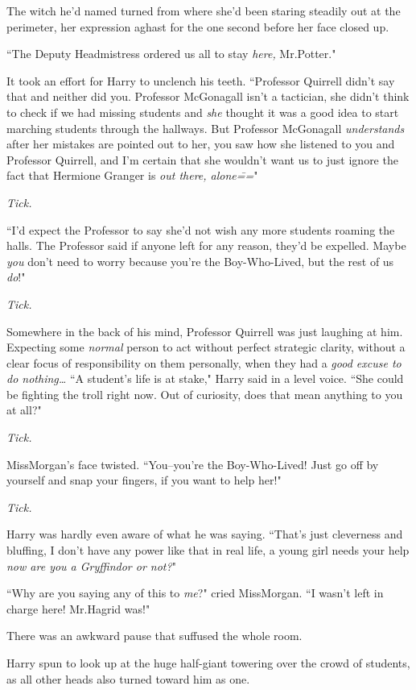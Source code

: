 The witch he'd named turned from where she'd been staring steadily out at the perimeter, her expression aghast for the one second before her face closed up.

``The Deputy Headmistress ordered us all to stay \emph{here,} Mr.\?Potter."

It took an effort for Harry to unclench his teeth. ``Professor Quirrell didn't say that and neither did you. Professor McGonagall isn't a tactician, she didn't think to check if we had missing students and \emph{she} thought it was a good idea to start marching students through the hallways. But Professor McGonagall \emph{understands} after her mistakes are pointed out to her, you saw how she listened to you and Professor Quirrell, and I'm certain that she wouldn't want us to just ignore the fact that Hermione Granger is \emph{out there, alone\===}"

\emph{Tick.}

``I'd expect the Professor to say she'd not wish any more students roaming the halls. The Professor said if anyone left for any reason, they'd be expelled. Maybe \emph{you} don't need to worry because you're the Boy-Who-Lived, but the rest of us \emph{do}!"

\emph{Tick.}

Somewhere in the back of his mind, Professor Quirrell was just laughing at him. Expecting some \emph{normal} person to act without perfect strategic clarity, without a clear focus of responsibility on them personally, when they had a \emph{good excuse to do nothing{\ldots}} ``A student's life is at stake," Harry said in a level voice. ``She could be fighting the troll right now. Out of curiosity, does that mean anything to you at all?"

\emph{Tick.}

Miss\?Morgan's face twisted. ``You\---you're the Boy-Who-Lived! Just go off by yourself and snap your fingers, if you want to help her!"

\emph{Tick.}

Harry was hardly even aware of what he was saying. ``That's just cleverness and bluffing, I don't have any power like that in real life, a young girl needs your help \emph{now are you a Gryffindor or not?}"

``Why are you saying any of this to \emph{me}?" cried Miss\?Morgan. ``I wasn't left in charge here! Mr.\?Hagrid was!"

There was an awkward pause that suffused the whole room.

Harry spun to look up at the huge half-giant towering over the crowd of students, as all other heads also turned toward him as one.

